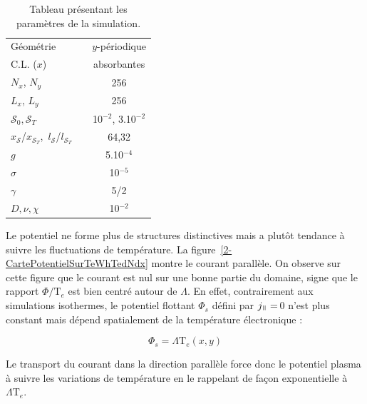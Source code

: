 \begin{refsection}
\begin{table}[!htbp]
\begin{tabular}{@{}lcc@{}}
\midrule 
Géométrie && $y$-périodique\\
C.L. ($x$)&& absorbantes\\
$N_x$, $N_y$ && 256\\
$L_x$, $L_y$ && 256\\
$\mathcal{S}_0,\mathcal{S}_T$ && 10$^{-2}$, 3.10$^{-2}$\\
$x_\mathcal{S}$/$x_{\mathcal{S}_T}$,~$l_\mathcal{S}$/$l_{\mathcal{S}_T}$ &&
64,32\\
$g$ && 5.10$^{-4}$\\
$\sigma$ && 10$^{-5}$\\
$\gamma$ && 5/2\\
$D,\nu, \chi$ && 10$^{-2}$\\
\bottomrule
\end{tabular}
\caption{Tableau présentant les paramètres de la
simulation.}\label{2-TokTempParam}
\end{table}


	
Le potentiel ne forme plus de structures
distinctives mais a 
plutôt tendance à suivre les fluctuations de température. La
figure~\ref{2-CartePotentielSurTeWhTedNdx} montre le courant parallèle. On
observe sur cette figure que le courant est nul sur une bonne partie du
domaine, signe que le rapport $\Phi/\text{T}_e$ est bien centré autour de
$\Lambda$. En effet,
contrairement aux simulations isothermes, le potentiel flottant $\Phi_s$ défini
par $j_\para=\,$0 n'est plus constant mais dépend spatialement de la
température électronique :

\begin{equation}
	\Phi_{s}=\Lambda\text{T}_e(x,y)
\end{equation}

Le transport du courant dans la direction
parallèle force donc le potentiel plasma à suivre les variations de température
en le rappelant de façon exponentielle à $\Lambda\text{T}_e$. 


\end{refsection}
